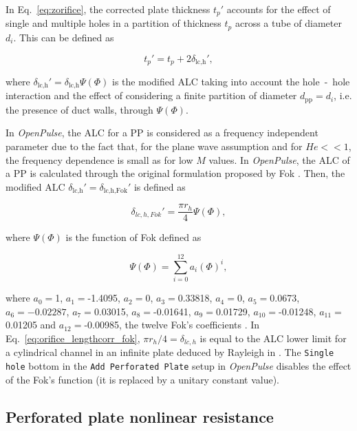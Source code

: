 \documentclass[12pt]{article}
\begin{document}
In  Eq.~\ref{eq:zorifice}, the corrected plate thickness $t_p'$ accounts for the effect of single and multiple holes in a partition of thickness $t_p$ across a tube of diameter $d_i$. This can be defined as

\begin{equation} \label{eq:pp_corrected_thickness}
	t_p' = t_p + 2\delta_{\text{lc,h}}',
\end{equation}

\noindent where $\delta_{\text{lc,h}}' = \delta_{\text{lc,h}} \Psi(\Phi) $ is the modified \acrshort{ALC} taking into account the hole~-~hole interaction and the effect of considering a finite partition of diameter $d_{\text{pp}} = d_i$, i.e. the presence of duct walls, through $\Psi(\Phi)$.

In \textit{OpenPulse}, the \acrshort{ALC} for a \acrshort{PP} is considered as a frequency independent parameter due to the fact that, for the plane wave assumption and for $He << 1$, the frequency dependence is small as for low $M$ values. In \textit{OpenPulse}, the \acrshort{ALC} of a \acrshort{PP} is calculated through the original formulation proposed by Fok \cite{fok,rschevkin}. Then, the modified \acrshort{ALC} $\delta_{\text{lc,h}}' = \delta_{\text{lc,h,Fok}}'$ is defined as 

\begin{equation} \label{eq:orifice_lengthcorr_fok}
	\delta_{lc,h,Fok}' = \frac{\pi r_h}{4} \Psi(\Phi),
\end{equation}

\noindent where $\Psi(\Phi)$ is the function of Fok defined as

\begin{equation} \label{eq:fok_sigma}
	\Psi (\Phi) = \sum_{i=0}^{12} a_i ( \Phi ) ^{i} ,
\end{equation}

\noindent where $a_0=$1, $a_1=$-1.4095, $a_2=$0, $a_3=$0.33818, $a_4=$0, $a_5=$0.0673, $a_6=-0.02287$, $a_7=$0.03015, $a_8=$-0.01641, $a_9=$0.01729, $a_{10}=$-0.01248, $a_{11}=$0.01205 and $a_{12}=$-0.00985, the twelve Fok's coefficients \cite{rschevkin}. In Eq.~\ref{eq:orifice_lengthcorr_fok}, $\pi r_h/4 = \delta_{lc,h}$ is equal to the \acrshort{ALC} lower limit for a cylindrical channel in an infinite plate deduced by Rayleigh in \cite{rayleigh1929theory}. The \texttt{Single hole} bottom in the \texttt{Add Perforated Plate} setup in \textit{OpenPulse} disables the effect of the Fok's function (it is replaced by a unitary constant value).

\subsection{Perforated plate nonlinear resistance} \label{subsec:pp_nonlinear}
\end{document}
